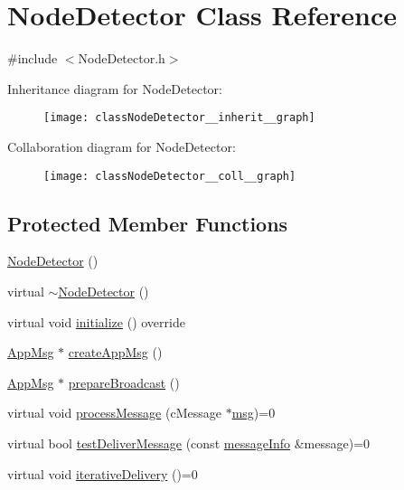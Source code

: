 \hypertarget{classNodeDetector}{}\section{Node\+Detector Class Reference}
\label{classNodeDetector}


{\ttfamily \#include $<$Node\+Detector.\+h$>$}



Inheritance diagram for Node\+Detector\+:\nopagebreak
\begin{figure}[H]
\begin{center}
\leavevmode
\texttt{[image: classNodeDetector\_\_inherit\_\_graph]}
\end{center}
\end{figure}


Collaboration diagram for Node\+Detector\+:\nopagebreak
\begin{figure}[H]
\begin{center}
\leavevmode
\texttt{[image: classNodeDetector\_\_coll\_\_graph]}
\end{center}
\end{figure}
\subsection*{Protected Member Functions}
\begin{DoxyCompactItemize}
\item 
\hyperlink{classNodeDetector_a256160d034631f4fa14a83787f504aae}{Node\+Detector} ()
\item 
virtual \hyperlink{classNodeDetector_a3f8e6eedfce05ea8953ff1a41413ccfa}{$\sim$\+Node\+Detector} ()
\item 
virtual void \hyperlink{classNodeDetector_aefa188ab0657837b1b57f24674d3ef22}{initialize} () override
\item 
\hyperlink{classAppMsg}{App\+Msg} $\ast$ \hyperlink{classNodeDetector_a7100349647350ad5e3aeb1ed4669c723}{create\+App\+Msg} ()
\item 
\hyperlink{classAppMsg}{App\+Msg} $\ast$ \hyperlink{classNodeDetector_af75cf37cc01fc51bc228a7a83c10cb97}{prepare\+Broadcast} ()
\item 
virtual void \hyperlink{classNodeDetector_ab69432c6d3327a684845ec231826727e}{process\+Message} (c\+Message $\ast$\hyperlink{Controller_8h_afa0f3b802fbc219228f7bb97996fa558}{msg})=0
\item 
virtual bool \hyperlink{classNodeDetector_a51e7dccd54e94bbe937752ca39dfdba4}{test\+Deliver\+Message} (const \hyperlink{structures_8h_a7e7bdc1d2fff8a9436f2f352b2711ed6}{message\+Info} \&message)=0
\item 
virtual void \hyperlink{classNodeDetector_a17ecf9939fce7471f4513b66185743cc}{iterative\+Delivery} ()=0
\end{DoxyCompactItemize}
